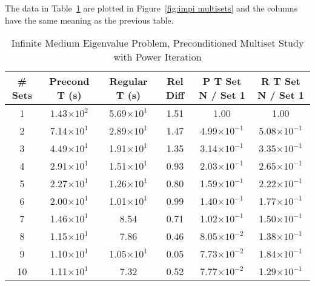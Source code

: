 The data in Table~\ref{table:impi multisets} are plotted in Figure~\ref{fig:impi multisets} and the columns have the same meaning as the previous table. 
\begin{table}[!h]
\caption{Infinite Medium Eigenvalue Problem, Preconditioned Multiset Study with Power Iteration}
\begin{center}
\begin{tabular}{|c |c |c |c |c |c|}
\hline
\# Sets & Precond T (s) & Regular T (s) & Rel Diff & P T Set N / Set 1 & R T Set N / Set 1 \\[0.5ex]
\hline
1   & 1.43$\times 10^{2}$ & 5.69$\times 10^{1}$ & 1.51 & 1.00                                & 1.00 \\
2   & 7.14$\times 10^{1}$ & 2.89$\times 10^{1}$ & 1.47 & 4.99$\times 10^{-1}$  & 5.08$\times 10^{-1}$ \\
3   & 4.49$\times 10^{1}$ & 1.91$\times 10^{1}$ & 1.35 & 3.14$\times 10^{-1}$  & 3.35$\times 10^{-1}$ \\ 
4   & 2.91$\times 10^{1}$ & 1.51$\times 10^{1}$ & 0.93 & 2.03$\times 10^{-1}$  & 2.65$\times 10^{-1}$ \\
5   & 2.27$\times 10^{1}$ & 1.26$\times 10^{1}$ & 0.80 & 1.59$\times 10^{-1}$  & 2.22$\times 10^{-1}$ \\
6   & 2.00$\times 10^{1}$ & 1.01$\times 10^{1}$ & 0.99 & 1.40$\times 10^{-1}$  & 1.77$\times 10^{-1}$ \\
7   & 1.46$\times 10^{1}$ & 8.54                             & 0.71 & 1.02$\times 10^{-1}$  & 1.50$\times 10^{-1}$ \\
8   & 1.15$\times 10^{1}$ & 7.86                             & 0.46 & 8.05$\times 10^{-2}$  & 1.38$\times 10^{-1}$ \\
9   & 1.10$\times 10^{1}$ & 1.05$\times 10^{1}$ & 0.05 & 7.73$\times 10^{-2}$  & 1.84$\times 10^{-1}$ \\
10 & 1.11$\times 10^{1}$ & 7.32                             & 0.52 & 7.77$\times 10^{-2}$  & 1.29$\times 10^{-1}$ \\
\hline 
\end{tabular} 
\end{center}
\label{table:impi multisets}
\end{table}